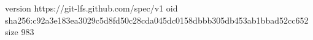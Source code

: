 version https://git-lfs.github.com/spec/v1
oid sha256:c92a3e183ea3029c5d8fd50c28cda045dc0158dbbb305db453ab1bbad52cc652
size 983
